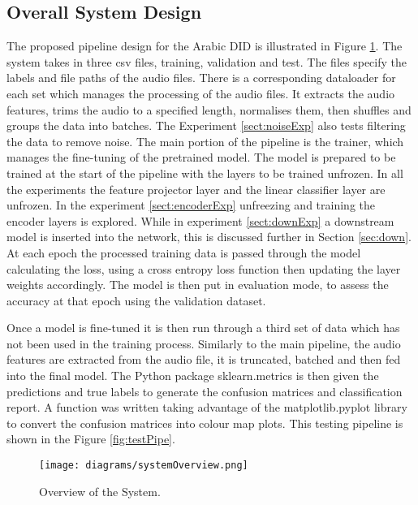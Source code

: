 \subsection{Overall System Design}

The proposed pipeline design for the Arabic DID is illustrated in Figure \ref{fig:sysOverview}. The system takes in three csv files, training, validation and test. The files specify the labels and file paths 
of the audio files.  There is a corresponding dataloader for each set which manages the processing of the 
audio files. It extracts the audio features, trims the audio to a specified length, normalises them, then shuffles and groups the data into 
batches. The Experiment \ref{sect:noiseExp} also tests filtering the data to remove noise. The main portion of the pipeline is the trainer, which manages the fine-tuning of the pretrained model. 
The model is prepared to be trained at the start of the pipeline with the layers to be trained unfrozen. In all the experiments 
the feature projector layer and the linear classifier layer are unfrozen. In the experiment \ref{sect:encoderExp} unfreezing and training 
the encoder layers is explored. While in experiment \ref{sect:downExp} a downstream model is inserted into the network, this is discussed further in Section 
\ref{sec:down}. At each epoch the processed training data is passed through the model calculating the loss, using a cross entropy loss function 
then updating the layer weights accordingly. The model is then put in evaluation mode, to assess the accuracy at that epoch using the validation dataset. 

Once a model is fine-tuned it is then run through a third set of data which has not been used in the training process. Similarly to 
the main pipeline, the audio features are extracted from the audio file, it is truncated, batched and then fed into the final model. The Python package 
sklearn.metrics is then given the predictions and true labels to generate the confusion matrices and classification report. A function was written taking advantage of the matplotlib.pyplot
library to convert the confusion matrices into colour map plots.  This testing pipeline is shown in the Figure \ref{fig:testPipe}.

\begin{figure}[h!]
    \centering
    \texttt{[image: diagrams/systemOverview.png]}
    \caption{Overview of the System.}
    \label{fig:sysOverview}
\end{figure}

